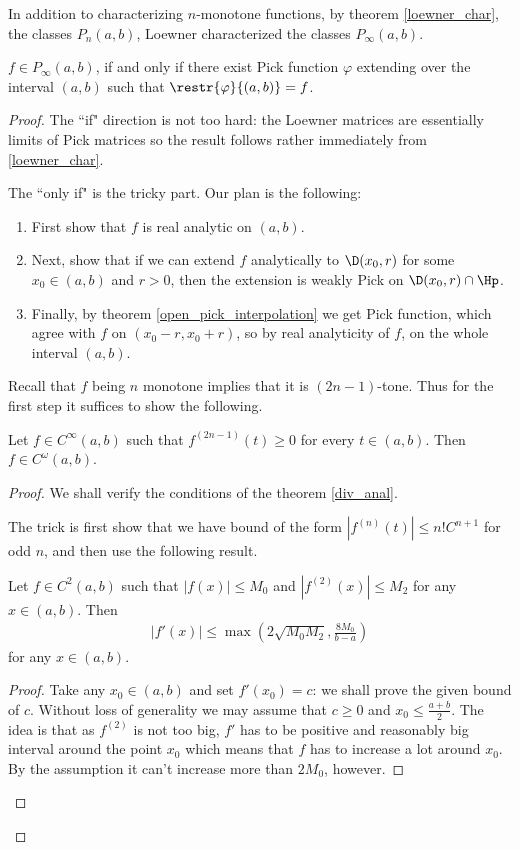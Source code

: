 In addition to characterizing $n$-monotone functions, by theorem \ref{loewner_char}, the classes $P_{n}(a, b)$, Loewner characterized the classes $P_{\infty}(a, b)$.

\begin{lause}\label{loewners_theorem}
	$f \in P_{\infty}(a, b)$, if and only if there exist Pick function $\varphi$ extending over the interval $(a, b)$ such that $\restr{\varphi}{(a, b)} = f$.
\end{lause}

\begin{proof}
	The ``if" direction is not too hard: the Loewner matrices are essentially limits of Pick matrices so the result follows rather immediately from \ref{loewner_char}.

	The ``only if" is the tricky part. Our plan is the following:
	\begin{enumerate}
		\item First show that $f$ is real analytic on $(a, b)$.
		\item Next, show that if we can extend $f$ analytically to $\D(x_{0}, r)$ for some $x_{0} \in (a, b)$ and $r > 0$, then the extension is weakly Pick on $\D(x_{0}, r) \cap \Hp$.
		\item Finally, by theorem \ref{open_pick_interpolation} we get Pick function, which agree with $f$ on $(x_{0} - r, x_{0} + r)$, so by real analyticity of $f$, on the whole interval $(a, b)$.
	\end{enumerate}

	Recall that $f$ being $n$ monotone implies that it is $(2 n - 1)$-tone. Thus for the first step it suffices to show the following.

	\begin{lem}
		Let $f \in C^{\infty}(a, b)$ such that $f^{(2 n - 1)}(t) \geq 0$ for every $t \in (a, b)$. Then $f \in C^{\omega}(a, b)$.
	\end{lem}
	\begin{proof}
		We shall verify the conditions of the theorem \ref{div_anal}.

		The trick is first show that we have bound of the form $|f^{(n)}(t)| \leq n! C^{n + 1}$ for odd $n$, and then use the following result.
		\begin{lem}
			Let $f \in C^{2}(a, b)$ such that $|f(x)| \leq M_{0}$ and $|f^{(2)}(x)| \leq M_{2}$ for any $x \in (a, b)$. Then
			\begin{align*}
			|f'(x)| \leq \max\left(2\sqrt{M_{0} M_{2}}, \frac{8 M_{0}}{b - a}\right)
			\end{align*}
			for any $x \in (a, b)$.
		\end{lem}
		\begin{proof}
			Take any $x_{0} \in (a, b)$ and set $f'(x_{0}) = c$: we shall prove the given bound of $c$. Without loss of generality we may assume that $c \geq 0$ and $x_{0} \leq \frac{a + b}{2}$. The idea is that as $f^{(2)}$ is not too big, $f'$ has to be positive and reasonably big interval around the point $x_{0}$ which means that $f$ has to increase a lot around $x_{0}$. By the assumption it can't increase more than $2 M_{0}$, however.


\end{proof}
\end{proof}
\end{proof}
